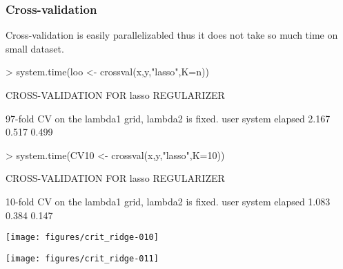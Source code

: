 \begin{frame}
  \frametitle{Cross-validation}

  Cross-validation is easily parallelizabled thus  it does not take so
  much time on small dataset.

\begin{Schunk}
\begin{Sinput}
> system.time(loo <- crossval(x,y,"lasso",K=n))
\end{Sinput}
\begin{Soutput}
CROSS-VALIDATION FOR  lasso  REGULARIZER 

97-fold CV on the lambda1 grid, lambda2 is fixed.
   user  system elapsed 
  2.167   0.517   0.499 
\end{Soutput}
\end{Schunk}

\begin{Schunk}
\begin{Sinput}
> system.time(CV10 <- crossval(x,y,"lasso",K=10))
\end{Sinput}
\begin{Soutput}
CROSS-VALIDATION FOR  lasso  REGULARIZER 

10-fold CV on the lambda1 grid, lambda2 is fixed.
   user  system elapsed 
  1.083   0.384   0.147 
\end{Soutput}
\end{Schunk}

\texttt{[image: figures/crit\_ridge-010]}

\texttt{[image: figures/crit\_ridge-011]}

\end{frame}

